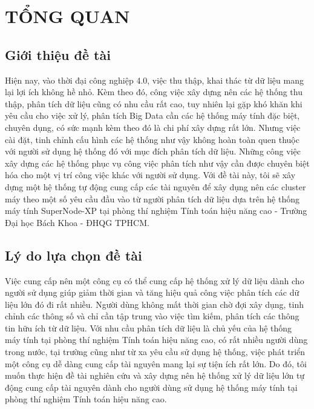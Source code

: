 \documentclass[11pt,a4paper]{article}
\begin{document}
\newpage
\section{TỔNG QUAN}
\subsection{Giới thiệu đề tài}
Hiện nay, vào thời đại công nghiệp 4.0, việc thu thập, khai thác từ dữ liệu mang lại lợi ích không hề nhỏ. Kèm theo đó, công việc xây dựng nên các hệ thống thu thập, phân tích dữ liệu cũng có nhu cầu rất cao, tuy nhiên lại gặp khó khăn khi yêu cầu cho việc xử lý, phân tích Big Data cần các hệ thống máy tính đặc biệt, chuyên dụng, có sức mạnh kèm theo đó là chi phí xây dựng rất lớn. Nhưng việc cài đặt, tinh chỉnh cấu hình các hệ thống như vậy không hoàn toàn quen thuộc với người sử dụng hệ thống đó với mục đích phân tích dữ liệu. Những công việc xây dựng các hệ thống phục vụ công việc phân tích như vậy cần được chuyên biệt hóa cho một vị trí công việc khác với người sử dụng. Với đề tài này, tôi sẽ xây dựng một hệ thống tự động cung cấp các tài nguyên để xây dụng nên các cluster máy theo một số yêu cầu đầu vào từ người phân tích dữ liệu dựa trên hệ thống máy tính SuperNode-XP tại phòng thí nghiệm Tính toán hiệu năng cao - Trường Đại học Bách Khoa - ĐHQG TPHCM.

\subsection{Lý do lựa chọn đề tài}
Việc cung cấp nên một công cụ có thể cung cấp hệ thống xử lý dữ liệu dành cho người sử dụng giúp giảm thời gian và tăng hiệu quả công việc phân tích các dữ liệu lớn đó đi rất nhiều. Người dùng không mất thời gian chờ đợi xây dụng, tinh chỉnh các thông số và chỉ cần tập trung vào việc tìm kiếm, phân tích các thông tin hữu ích từ dữ liệu. Với nhu cầu phân tích dữ liệu là chủ yếu của hệ thống máy tính tại phòng thí nghiệm Tính toán hiệu năng cao, có rất nhiều người dùng trong nước, tại trường cũng như từ xa yêu cầu sử dụng hệ thống, việc phát triển một công cụ dễ dàng cung cấp tài nguyên mang lại sự tiện ích rất lớn. Do đó, tôi muốn thực hiện đề tài nghiên cứu và xây dựng nên hệ thống xử lý dữ liệu lớn tự động cung cấp tài nguyên dành cho người dùng sử dụng hệ thống máy tính tại phòng thí nghiệm Tính toán hiệu năng cao.
\end{document}
